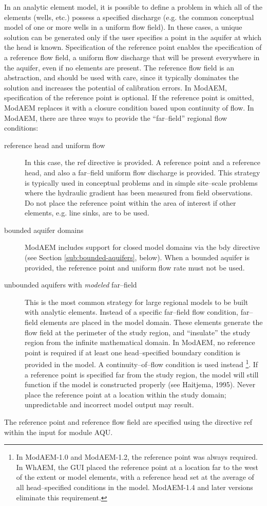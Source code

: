 In an analytic element model, it is possible to define a problem in which all of the elements (wells, etc.) possess a specified discharge (e.g. the common conceptual model of one or more wells in a uniform flow field). In these cases, a unique solution can be generated only if the user specifies a point in the aquifer at which the head is known. Specification of the reference point enables the specification of a reference flow field, a uniform flow discharge that will be present everywhere in the aquifer, even if no elements are present. The reference flow field is an abstraction, and should be used with care, since it typically dominates the solution and increases the potential of calibration errors. In ModAEM, specification of the reference point is optional. If the reference point is omitted, ModAEM replaces it with a closure condition based upon continuity of flow. In ModAEM, there are three ways to provide the ``far--field'' regional flow conditions:
\begin{description}
\item [{reference head and uniform flow}] In this case, the \textsf{ref} directive is provided. A reference point and a reference head, and also a far--field uniform flow discharge is provided. This strategy is typically used in conceptual problems and in simple site--scale problems where the hydraulic gradient has been measured from field observations. Do not place the reference point within the area of interest if other elements, e.g. line sinks, are to be used.
\item [{bounded aquifer domains}] ModAEM includes support for closed model domains via the \textsf{bdy} directive (see Section \ref{sub:bounded-aquifers}, below). When a bounded aquifer is provided, the reference point and uniform flow rate must not be used. \item [{unbounded aquifers with \emph{modeled} far--field}] This is the most common strategy for large regional models to be built with analytic elements. Instead of a specific far--field flow condition, far--field elements are placed in the model domain. These elements generate the flow field at the perimeter of the study region, and ``insulate'' the study region from the infinite mathematical domain. In ModAEM, no reference point is required if at least one head--specified boundary condition is provided in the model. A continuity--of--flow condition is used instead \footnote{In ModAEM-1.0 and ModAEM-1.2, the reference point was always required. In WhAEM, the GUI placed the reference point at a location far to the west of the extent or model elements, with a reference head set at the average of all head--specified conditions in the model. ModAEM-1.4 and later versions eliminate this requirement.}. If a reference point is specified far from the study region, the model will still function if the model is constructed properly (see Haitjema, 1995). Never place the reference point at a location within the study domain; unpredictable and incorrect model output may result.
\end{description}
The reference point and reference flow field are specified using the directive \textsf{ref} within the input for module AQU. 
